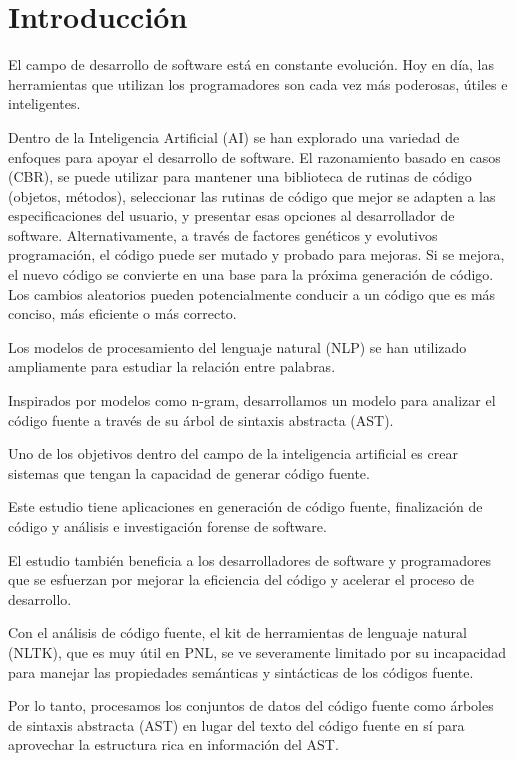 \section*{Introducción}
El campo de desarrollo de software está en constante evolución. 
Hoy en día, las herramientas que utilizan los programadores 
son cada vez más poderosas, útiles e inteligentes.

Dentro de la Inteligencia Artificial (AI) se han explorado 
una variedad de enfoques para apoyar el desarrollo de software.
El razonamiento basado en casos (CBR), se puede utilizar para
mantener una biblioteca de rutinas de código (objetos, métodos),
seleccionar las rutinas de código 
que mejor se adapten a las especificaciones del usuario,
y presentar esas opciones al desarrollador de software.
Alternativamente, a través de factores genéticos y evolutivos
programación, el código puede ser mutado y probado para mejoras. 
Si se mejora, el nuevo código se convierte en una base
para la próxima generación de código. Los cambios aleatorios pueden
potencialmente conducir a un código que es más conciso, más
eficiente o más correcto. 

Los modelos de procesamiento del lenguaje natural (NLP) 
se han utilizado ampliamente para estudiar la relación entre palabras. 

Inspirados por modelos como n-gram, desarrollamos un modelo 
para analizar el código fuente a través de su árbol de sintaxis abstracta (AST). 

Uno de los objetivos dentro del campo de la inteligencia artificial 
es crear sistemas que tengan la capacidad de generar código fuente.

Este estudio tiene aplicaciones en generación de código fuente, 
finalización de código y análisis e investigación forense de software. 

El estudio también beneficia a los desarrolladores de software y programadores 
que se esfuerzan por mejorar la eficiencia del código 
y acelerar el proceso de desarrollo. 

Con el análisis de código fuente, 
el kit de herramientas de lenguaje natural (NLTK), 
que es muy útil en PNL, se ve severamente limitado 
por su incapacidad para manejar 
las propiedades semánticas y sintácticas de los códigos fuente. 

Por lo tanto, procesamos los conjuntos de datos del código fuente 
como árboles de sintaxis abstracta (AST) 
en lugar del texto del código fuente en sí 
para aprovechar la estructura rica en información del AST. 

